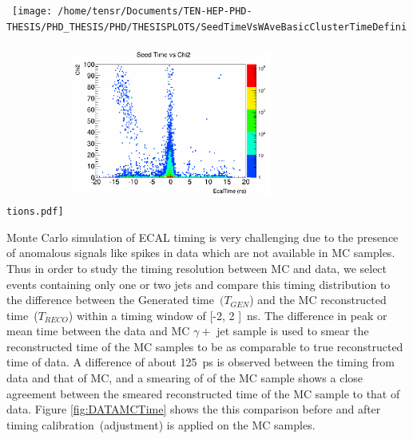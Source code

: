 \begin{center}
\centering
\mbox{
\texttt{[image: /home/tensr/Documents/TEN-HEP-PHD-THESIS/PHD\_THESIS/PHD/THESISPLOTS/SeedTimeVsWAveBasicClusterTimeDefinitions.pdf]}
\includegraphics[height=6cm, width=0.5\textwidth]{THESISPLOTS/Seed-Time-Chi2.png}
}
\label{fig:TIME}
\end{center}

Monte Carlo simulation of ECAL timing is very challenging due to the presence of anomalous signals like spikes in data which are not available in MC samples.  Thus in order to study the timing resolution between MC and data, we select events containing only one or two jets and compare this timing distribution to the difference between the Generated time~$(T_{GEN}$) and the MC reconstructed time~($T_{RECO}$) within a timing window of [-2, 2 ]~ns. The difference in peak or mean time between the data and MC $\gamma +$ jet sample is used to smear the reconstructed time of the MC samples to be as comparable to true reconstructed time of data. A difference of about 125~ps is observed between the timing from data and that of MC, and a smearing of of the MC sample shows a close agreement between the smeared reconstructed time of the MC sample to that of data.
Figure \ref{fig:DATAMCTime} shows the this comparison before and after timing calibration~(adjustment) is applied on the MC samples.


